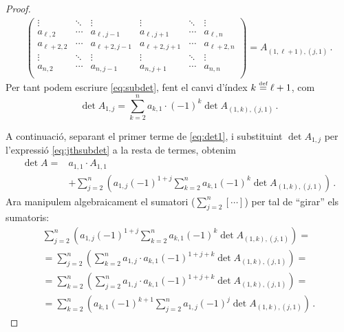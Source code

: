 \begin{proof}
\begin{equation*}
\begin{split}
\begin{pmatrix}
				\vdots & \ddots & \vdots & \vdots & \ddots & \vdots \\
				a_{\ell,2} & \cdots & a_{\ell,j-1} & a_{\ell,j+1} & \cdots & a_{\ell,n} \\
				a_{\ell+2,2} & \cdots & a_{\ell+2,j-1} & a_{\ell+2,j+1} & \cdots & a_{\ell+2,n} \\
				\vdots & \ddots & \vdots & \vdots & \ddots & \vdots \\
				a_{n,2}      & \cdots & a_{n,j-1}      & a_{n,j+1}      & \cdots & a_{n,n}      \\
			\end{pmatrix} = A_{(1,\ell+1),(j,1)}
			\,.
		\end{split}
	\end{equation*}
	Per tant podem escriure \eqref{eq:subdet}, fent el canvi d'índex $k\stackrel{\text{\tiny def}}{=} \ell+1$, com 
	\begin{equation}\label{eq:jthsubdet}
		\det A_{1,j} = \sum_{k=2}^{n} a_{k,1}\cdot(-1)^{k}\det A_{(1,k),(j,1)}\,.
	\end{equation}
	
	A continuació, separant el primer terme de \eqref{eq:det1}, i substituint $\det A_{1,j}$ per l'expressió \eqref{eq:jthsubdet} a la resta de termes, obtenim
	\begin{equation}\label{eq:parrafada}
		\begin{split}
			\det A ={}& a_{1,1}\cdot A_{1,1} \\
			&+\sum_{j=2}^{n} \left(a_{1,j} (-1)^{1+j}  \sum_{k=2}^{n} a_{k,1} (-1)^{k} \det A_{(1,k),(j,1)}\right)\,.
		\end{split}
	\end{equation}
	Ara manipulem algebraicament el sumatori  ($\sum_{j=2}^n [\cdots]$) per tal de ``girar'' els sumatoris:
	\begin{multline}\label{eq:sumofjth}
		\sum_{j=2}^{n} \left(a_{1,j} (-1)^{1+j}  \sum_{k=2}^{n} a_{k,1} (-1)^{k} \det A_{(1,k),(j,1)}\right)=\\
		=\sum_{j=2}^{n} \left(  \sum_{k=2}^{n} a_{1,j}\cdot a_{k,1} (-1)^{1+j+k} \det A_{(1,k),(j,1)}\right)=\\
		=\sum_{k=2}^{n} \left(  \sum_{j=2}^{n} a_{1,j}\cdot a_{k,1} (-1)^{1+j+k} \det A_{(1,k),(j,1)}\right)=\\
		=\sum_{k=2}^{n} \left(a_{k,1} (-1)^{k+1}  \sum_{j=2}^{n} a_{1,j} (-1)^{j} \det A_{(1,k),(j,1)}\right)\,.
	\end{multline}
	

\end{proof}
